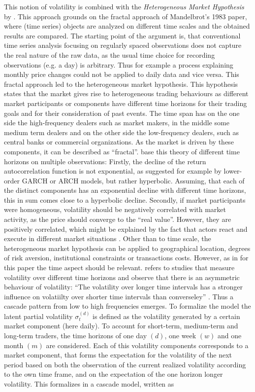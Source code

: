 This notion of volatility is combined with the \emph{Heterogeneous Market Hypothesis} by \textcite{mueller1993}. This approach grounds on the fractal approach of Mandelbrot's 1983 paper, where (time series) objects are analyzed on different time scales and the obtained results are compared. The starting point of the argument is, that conventional time series analysis focusing on regularly spaced observations does not capture the real nature of the raw data, as the usual time choice for recording observations (e.g. a day) is arbitrary. Thus for example a process explaining monthly price changes could not be applied to daily data and vice versa. This fractal approach led to the heterogeneous market hypothesis. This hypothesis states that the market gives rise to heterogeneous trading behaviours as different market participants or components have different time horizons for their trading goals and for their consideration of past events. The time span has on the one side the high-frequency dealers such as market makers, in the middle some medium term dealers and on the other side the low-frequency dealers, such as central banks or commercial organizations. As the market is driven by these components, it can be described as ``fractal''. \textcite{mueller1993} base this theory of different time horizons on multiple observations: Firstly, the decline of the return autocorrelation function is not exponential, as suggested for example by lower-order GARCH or ARCH models, but rather hyperbolic. Assuming, that each of the distinct components has an exponential decline with different time horizons, this in sum comes close to a hyperbolic decline. Secondly, if market participants were homogeneous, volatility should be negatively correlated with market activity, as the price should converge to the ``real value''. However, they are positively correlated, which might be explained by the fact that actors react and execute in different market situations \parencite{mueller1993}. Other than to time scale, the heterogeneous market hypothesis can be applied to geographical location, degrees of risk aversion, institutional constraints or transactions costs. However, as in \textcite{corsi2009} for this paper the time aspect should be relevant. \textcite{corsi2009} refers to studies that measure volatility over different time horizons and observe that there is an asymmetric behaviour of volatility: ``The volatility over longer time intervals has a stronger influence on volatiilty over shorter time intervals than converseley'' \parencite[p.178]{corsi2009}. Thus a cascade pattern from low to high frequencies emerges. To formalize the model the latent partial volatility $\sigma_{t}^{(d)}$ is defined as the volatility generated by a certain market component (here daily). To account for short-term, medium-term and long-term traders, the time horizons of one day $(d)$, one week $(w)$ and one month $(m)$ are considered. Each of this volatility components corresponds to a market component, that forms the expectation for the volatility of the next period based on both the observation of the current realized volatility according to the own time frame, and on the expectation of the one horizon longer volatility. This formalizes in a cascade model, written as
